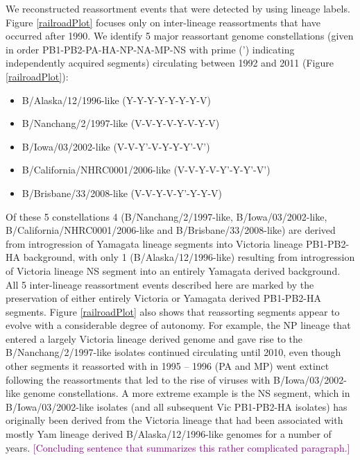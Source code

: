 \documentclass[11pt,oneside,letterpaper]{article}
\def\tbc#1{\textcolor{purple}{[#1]}}
\begin{document}
We reconstructed reassortment events that were detected by using lineage labels.
Figure \ref{railroadPlot} focuses only on inter-lineage reassortments that have occurred after 1990.
We identify 5 major reassortant genome constellations (given in order PB1-PB2-PA-HA-NP-NA-MP-NS with prime (') indicating independently acquired segments) circulating between 1992 and 2011 (Figure \ref{railroadPlot}):
\begin{itemize}
  \item B/Alaska/12/1996-like (Y-Y-Y-Y-Y-Y-Y-V)
  \item B/Nanchang/2/1997-like (V-V-Y-V-Y-V-Y-V)
  \item B/Iowa/03/2002-like (V-V-Y'-V-Y-Y-Y'-V')
  \item B/California/NHRC0001/2006-like (V-V-Y-V-Y'-Y-Y'-V')
  \item B/Brisbane/33/2008-like (V-V-Y-V-Y'-Y-Y-V)
\end{itemize}
Of these 5 constellations 4 (B/Nanchang/2/1997-like, B/Iowa/03/2002-like, \\B/California/NHRC0001/2006-like and B/Brisbane/33/2008-like) are derived from introgression of Yamagata lineage segments into Victoria lineage PB1-PB2-HA background, with only 1 (B/Alaska/12/1996-like) resulting from introgression of Victoria lineage NS segment into an entirely Yamagata derived background.
All 5 inter-lineage reassortment events described here are marked by the preservation of either entirely Victoria or Yamagata derived PB1-PB2-HA segments.
Figure \ref{railroadPlot} also shows that reassorting segments appear to evolve with a considerable degree of autonomy.
For example, the NP lineage that entered a largely Victoria lineage derived genome and gave rise to the B/Nanchang/2/1997-like isolates continued circulating until 2010, even though other segments it reassorted with in 1995 -- 1996 (PA and MP) went extinct following the reassortments that led to the rise of viruses with B/Iowa/03/2002-like genome constellations.
A more extreme example is the NS segment, which in B/Iowa/03/2002-like isolates (and all subsequent Vic PB1-PB2-HA isolates) has originally been derived from the Victoria lineage that had been associated with mostly Yam lineage derived B/Alaska/12/1996-like genomes for a number of years.
\tbc{Concluding sentence that summarizes this rather complicated paragraph.}
\end{document}
